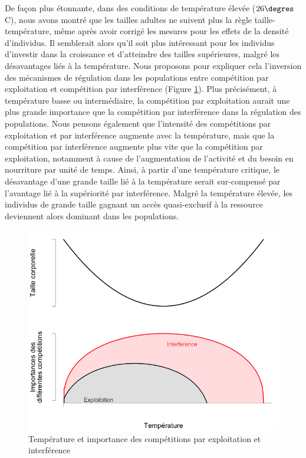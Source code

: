 De façon plus étonnante, dans des conditions de température élevée
($26\degres$C), nous avons montré que les tailles adultes ne suivent plus la
règle taille-température, même après avoir corrigé les mesures pour les effets
de la densité d'individus. Il semblerait alors qu'il soit plus intéressant pour
les individus d'investir dans la croissance et d'atteindre des tailles
supérieures, malgré les désavantages liés à la température. Nous proposons pour
expliquer cela l'inversion des mécanismes de régulation dans les populations
entre compétition par exploitation et compétition par interférence (Figure
\ref{fig:Concl2}). Plus précisément, à température basse ou intermédiaire, la
compétition par exploitation aurait une plus grande importance que la
compétition par interférence dans la régulation des populations. Nous pensons
également que l'intensité des compétitions par exploitation et par interférence
augmente avec la température, mais que la compétition par interférence augmente
plus vite que la compétition par exploitation, notamment à cause de
l'augmentation de l'activité et du besoin en nourriture par unité de temps.
Ainsi, à partir d'une température critique, le désavantage d'une grande taille
lié à la température serait sur-compensé par l'avantage lié à la supériorité par
interférence. Malgré la température élevée, les individus de grande taille
gagnant un accès quasi-exclusif à la ressource deviennent alors dominant dans
les populations.

\begin{figure}[!ht]
\begin{center}
\includegraphics[width=1\textwidth]{Conclu/TempSizeRule2}
\caption[Température et importance des
compétitions par exploitation et interférence]{Température et importance des
compétitions par exploitation et interférence}
\label{fig:Concl2}
\end{center}
\end{figure}


